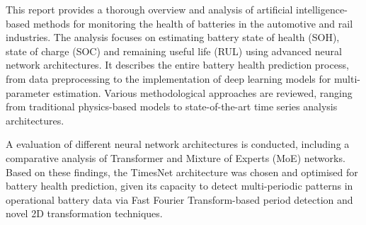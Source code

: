 This report provides a thorough overview and analysis of artificial intelligence-based methods for monitoring the health of batteries in the automotive and rail industries. The analysis focuses on estimating battery state of health (SOH), state of charge (SOC) and remaining useful life (RUL) using advanced neural network architectures. It describes the entire battery health prediction process, from data preprocessing to the implementation of deep learning models for multi-parameter estimation. Various methodological approaches are reviewed, ranging from traditional physics-based models to state-of-the-art time series analysis architectures.

A evaluation of different neural network architectures is conducted, including a comparative analysis of Transformer and Mixture of Experts (MoE) networks. Based on these findings, the TimesNet architecture was chosen and optimised for battery health prediction, given its capacity to detect multi-periodic patterns in operational battery data via Fast Fourier Transform-based period detection and novel 2D transformation techniques.


\bigskip

\endgroup
